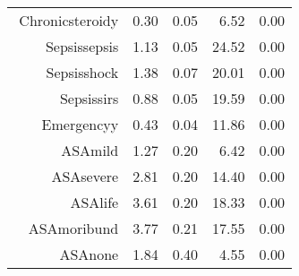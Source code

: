 \begin{tabular}{rrrrr}
$$  Chronic\-steroid\-y & 0.30 & 0.05 & 6.52 & 0.00 \\ 
  Sepsis\-sepsis & 1.13 & 0.05 & 24.52 & 0.00 \\ 
  Sepsis\-shock & 1.38 & 0.07 & 20.01 & 0.00 \\ 
  Sepsis\-sirs & 0.88 & 0.05 & 19.59 & 0.00 \\ 
  Emergency\-y & 0.43 & 0.04 & 11.86 & 0.00 \\ 
  ASA\-mild & 1.27 & 0.20 & 6.42 & 0.00 \\ 
  ASA\-severe & 2.81 & 0.20 & 14.40 & 0.00 \\ 
  ASA\-life & 3.61 & 0.20 & 18.33 & 0.00 \\ 
  ASA\-moribund & 3.77 & 0.21 & 17.55 & 0.00 \\ 
  ASA\-none & 1.84 & 0.40 & 4.55 & 0.00 \\ 
   \hline
\end{tabular}

